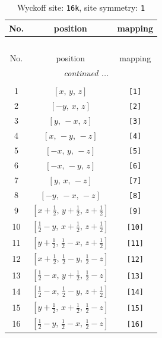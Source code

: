 \documentclass[fleqn,8pt]{jsarticle}
\begin{document}
\begin{longtable}{ccc}
\caption{Wyckoff site: {\tt 16k}, site symmetry: {\tt 1}}
 \\
 \hline \hline
No. & position & mapping \\ \hline \endfirsthead

\multicolumn{2}{l}{\tablename\ \thetable{}} \\
 \hline \hline
No. & position & mapping \\ \hline \endhead

 \hline \hline
\multicolumn{2}{r}{\footnotesize\it continued ...} \\ \endfoot

 \hline \hline
\multicolumn{2}{r}{} \\ \endlastfoot

1 & $\left[ x,\, y,\, z \right]$ & {\tt [1]} \\ \hline
2 & $\left[ - y,\, x,\, z \right]$ & {\tt [2]} \\ \hline
3 & $\left[ y,\, - x,\, z \right]$ & {\tt [3]} \\ \hline
4 & $\left[ x,\, - y,\, - z \right]$ & {\tt [4]} \\ \hline
5 & $\left[ - x,\, y,\, - z \right]$ & {\tt [5]} \\ \hline
6 & $\left[ - x,\, - y,\, z \right]$ & {\tt [6]} \\ \hline
7 & $\left[ y,\, x,\, - z \right]$ & {\tt [7]} \\ \hline
8 & $\left[ - y,\, - x,\, - z \right]$ & {\tt [8]} \\ \hline
9 & $\left[ x + \frac{1}{2},\, y + \frac{1}{2},\, z + \frac{1}{2} \right]$ & {\tt [9]} \\ \hline
10 & $\left[ \frac{1}{2} - y,\, x + \frac{1}{2},\, z + \frac{1}{2} \right]$ & {\tt [10]} \\ \hline
11 & $\left[ y + \frac{1}{2},\, \frac{1}{2} - x,\, z + \frac{1}{2} \right]$ & {\tt [11]} \\ \hline
12 & $\left[ x + \frac{1}{2},\, \frac{1}{2} - y,\, \frac{1}{2} - z \right]$ & {\tt [12]} \\ \hline
13 & $\left[ \frac{1}{2} - x,\, y + \frac{1}{2},\, \frac{1}{2} - z \right]$ & {\tt [13]} \\ \hline
14 & $\left[ \frac{1}{2} - x,\, \frac{1}{2} - y,\, z + \frac{1}{2} \right]$ & {\tt [14]} \\ \hline
15 & $\left[ y + \frac{1}{2},\, x + \frac{1}{2},\, \frac{1}{2} - z \right]$ & {\tt [15]} \\ \hline
16 & $\left[ \frac{1}{2} - y,\, \frac{1}{2} - x,\, \frac{1}{2} - z \right]$ & {\tt [16]} \\
\end{longtable}
\end{document}

